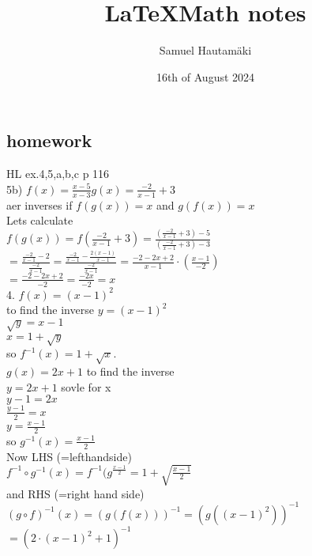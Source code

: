 \documentclass{article}
\title{\LaTeX Math notes}
\author{Samuel Hautamäki}
\date{16th of August 2024}
\begin{document}
  \maketitle
  
  \subsection{homework}
  HL ex.4,5,a,b,c p 116\\
  5b) $f(x)=\frac{x-5}{x-3} g(x)=\frac{-2}{x-1}+3$\\
  aer inverses if $f(g(x))=x$ and $g(f(x))=x$\\
  Lets calculate\\
  $f(g(x))=f(\frac{-2}{x-1}+3)=\frac{(\frac{-2}{x-1}+3)-5}{(\frac{-2}{x-1}+3)-3}$\\
  $=\frac{\frac{-2}{x-1}-2}{\frac{-2}{x-1}}=\frac{\frac{-2}{x-1}-\frac{2(x-1)}{x-1}}{\frac{-2}{x-1}}=\frac{-2-2x+2}{x-1}\cdot (\frac{x-1}{-2})$\\
  $=\frac{-2-2x+2}{-2}=\frac{-2x}{-2}=x$\\
  4. $f(x)=(x-1)^2$\\
  to find the inverse $y=(x-1)^2$\\
  $\sqrt{y}=x-1$\\
  $x=1+\sqrt{y}$\\
  so $f^{-1}(x)=1+\sqrt{x}.$\\
  $g (x)=2x+1$ to find the inverse\\
  $y=2x+1$ sovle for x\\
  $y-1=2x$\\
  $\frac{y-1}{2}=x$\\
  $y=\frac{x-1}{2}$\\
  so $g^{-1}(x)=\frac{x-1}{2}$\\
  Now LHS (=lefthandside)\\
  $f^{-1}\circ g^{-1} (x)=f^{-1}(g^{\frac{
    x-1
  }{2}}=1+\sqrt{\frac{x-1}{2}}$\\
  and RHS (=right hand side)\\
  $(g\circ f)^{-1}(x)=(g(f(x)))^{-1}=(g((x-1)^2))^{-1}$\\
  $=(2\cdot(x-1)^2+1)^{-1}$\\
\end{document}
